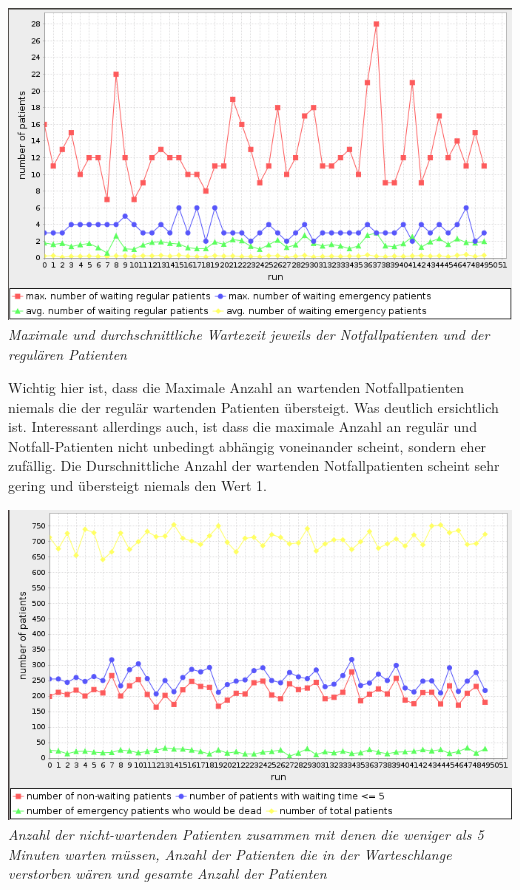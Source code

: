 \documentclass{article}
\begin{document}
\begin{center}
\includegraphics[scale=0.4]{img/max_avg_patients.png}\\
\textit{Maximale und durchschnittliche Wartezeit jeweils der Notfallpatienten und der regulären Patienten}\\
\end{center}
\vspace{\baselineskip}
Wichtig hier ist, dass die Maximale Anzahl an wartenden Notfallpatienten niemals die der regulär wartenden Patienten übersteigt. Was deutlich ersichtlich ist. Interessant allerdings auch, ist dass die maximale Anzahl an regulär und Notfall-Patienten nicht unbedingt abhängig voneinander scheint, sondern eher zufällig. Die Durschnittliche Anzahl der wartenden Notfallpatienten scheint sehr gering und übersteigt niemals den Wert 1.

\begin{center}
\includegraphics[scale=0.4]{img/not_less_waiting.png}\\
\textit{Anzahl der nicht-wartenden Patienten zusammen mit denen die weniger als 5 Minuten warten müssen, Anzahl der Patienten die in der Warteschlange verstorben wären und gesamte Anzahl der Patienten}\\
\end{center}
\vspace{\baselineskip}
\end{document}
